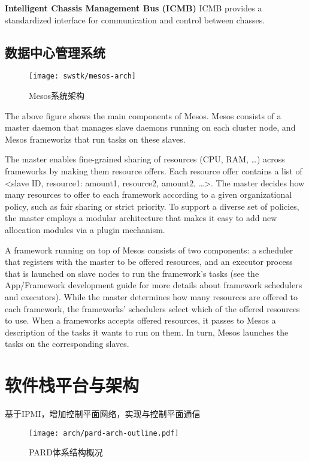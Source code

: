 \textbf{Intelligent Chassis Management Bus (ICMB)}\quad
ICMB provides a standardized interface for communication and control between chasses.


\subsection{数据中心管理系统}

\begin{figure}[tbh]
  \centering
  \texttt{[image: swstk/mesos-arch]}
  \caption{Mesos系统架构}
  \label{fig:mesos-arch}
\end{figure}

The above figure shows the main components of Mesos. Mesos consists of a master daemon that manages slave daemons running on each cluster node, and Mesos frameworks that run tasks on these slaves.

The master enables fine-grained sharing of resources (CPU, RAM, …) across frameworks by making them resource offers. Each resource offer contains a list of <slave ID, resource1: amount1, resource2, amount2, …>. The master decides how many resources to offer to each framework according to a given organizational policy, such as fair sharing or strict priority. To support a diverse set of policies, the master employs a modular architecture that makes it easy to add new allocation modules via a plugin mechanism.

A framework running on top of Mesos consists of two components: a scheduler that registers with the master to be offered resources, and an executor process that is launched on slave nodes to run the framework’s tasks (see the App/Framework development guide for more details about framework schedulers and executors). While the master determines how many resources are offered to each framework, the frameworks' schedulers select which of the offered resources to use. When a frameworks accepts offered resources, it passes to Mesos a description of the tasks it wants to run on them. In turn, Mesos launches the tasks on the corresponding slaves.

\section{软件栈平台与架构}

基于IPMI，增加控制平面网络，实现与控制平面通信

\begin{figure}[tbh]
  \centering
  \texttt{[image: arch/pard-arch-outline.pdf]}
  \caption[PARD体系结构概况]{PARD体系结构概况}
  \label{fig:pard-arch-outline}
\end{figure}


